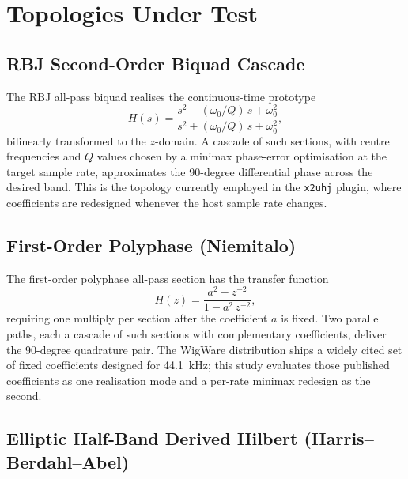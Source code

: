 \documentclass[11pt,a4paper]{article}
\begin{document}
\section{Topologies Under Test}

\subsection{RBJ Second-Order Biquad Cascade}

The RBJ all-pass biquad \cite{RBJCookbook} realises the continuous-time
prototype
\begin{equation}
  H(s) = \frac{s^2 - (\omega_0/Q)\,s + \omega_0^2}
              {s^2 + (\omega_0/Q)\,s + \omega_0^2},
\end{equation}
bilinearly transformed to the $z$-domain.
A cascade of such sections, with centre frequencies and $Q$ values chosen by a
minimax phase-error optimisation at the target sample rate, approximates the
90-degree differential phase across the desired band.
This is the topology currently employed in the \texttt{x2uhj} plugin, where
coefficients are redesigned whenever the host sample rate changes.

\subsection{First-Order Polyphase (Niemitalo)}

The first-order polyphase all-pass section \cite{Niemitalo2003,Ansari1987Hilbert}
has the transfer function
\begin{equation}
  H(z) = \frac{a^2 - z^{-2}}{1 - a^2\,z^{-2}},
\end{equation}
requiring one multiply per section after the coefficient $a$ is fixed.
Two parallel paths, each a cascade of such sections with complementary
coefficients, deliver the 90-degree quadrature pair.
The WigWare distribution \cite{WigginsWigWare} ships a widely cited set of
fixed coefficients designed for \SI{44.1}{\kilo\hertz}; this study evaluates
those published coefficients as one realisation mode and a per-rate minimax
redesign as the second.

\subsection{Elliptic Half-Band Derived Hilbert (Harris–Berdahl–Abel)}
\end{document}
